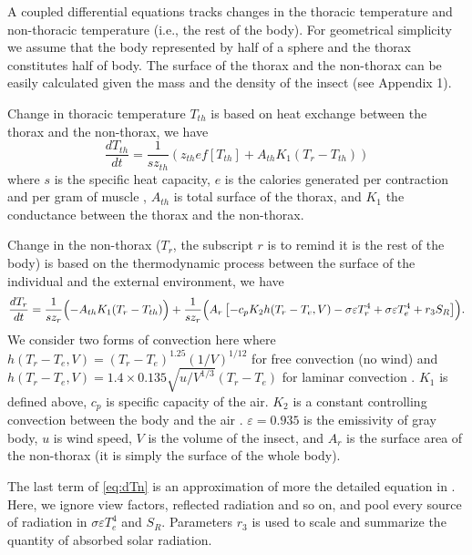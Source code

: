 A coupled differential equations  tracks changes in the thoracic temperature and non-thoracic temperature (i.e., the rest of the body).
For geometrical simplicity we assume that the body represented by half of a sphere and the thorax constitutes half of body.
The surface of the thorax and the non-thorax can be easily calculated given the mass and the density of the insect (see Appendix 1).

Change in thoracic temperature $T_{th}$ is based on heat exchange between the thorax and the non-thorax, we have 
\begin{equation} \label{eq:dTh}
	\frac{dT_{th}}{dt} = \frac{1}{s z_{th}} (z_{th} e f[T_{th}] +  A_{th} K_1(T_r - T_{th}))
\end{equation}
where $s$ is the specific heat capacity, $e$ is the calories generated per contraction and per gram of muscle \citep{Kammer1974}, $A_{th}$ is total surface of the thorax, and $K_1$ the conductance between the thorax and the non-thorax.

Change in the  non-thorax ($T_r$, the subscript $r$ is to remind it is the rest of the body) is based on the thermodynamic process between the surface of the individual and the external environment, we have
\begin{equation} \label{eq:dTn} 
		\frac{dT_r}{dt} =  \frac{1}{s z_{r}} \Bigl( - A_{th} K_1(T_r - T_{th})  \Bigr)
			+ \frac{1}{s z_{r}} \Bigl( A_r \left[ - c_p K_2 h(T_r -T_e, V)- \sigma \varepsilon T_r^4 + \sigma \varepsilon T_e^4  + r_3 S_R  \right] \Bigr).
\end{equation}
We consider two forms of convection here where $ h(T_r -T_e, V) = (T_r- T_e)^{1.25} (1/V)^{1/12 }$ for free convection (no wind) and $ h(T_r -T_e, V) =  1.4 \times 0.135 \sqrt{u/V^{1/3}} (T_r- T_e) $ for laminar convection \citep{Campbell2012}.
%
$K_1$ is defined above, $c_p$ is specific capacity of the air.
$K_2$ is a constant controlling convection between the body and the air \citep{Campbell2012}.
$\varepsilon = 0.935$  is the emissivity of gray body, $u$ is wind speed, $V$ is the volume of the insect, and $A_r$ is the surface area of the non-thorax (it is simply the surface of the whole body).

The last term of \cref{eq:dTn}  is an approximation of more the detailed equation in \citet{Campbell2012}.
Here, we ignore view factors, reflected radiation and so on, and pool every source of radiation in $ \sigma \varepsilon T_e^4$ and $S_R$. 
Parameters $r_3$ is used to scale and summarize the quantity of absorbed solar radiation.

